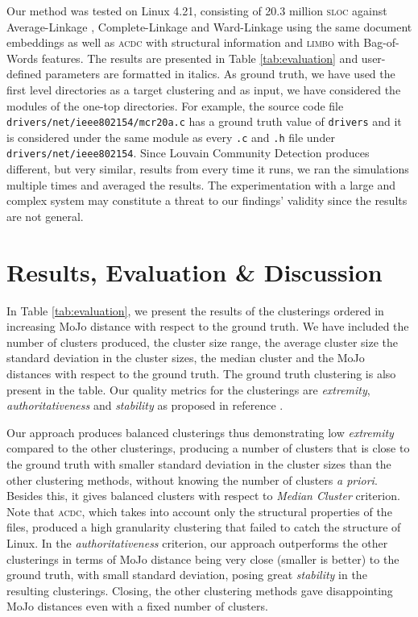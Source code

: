 \documentclass[sigconf, screen]{acmart}
\begin{document}
 Our method was tested on Linux 4.21,
consisting of 20.3 million \textsc{sloc} against Average-Linkage \cite{average}, Complete-Linkage \cite{complete} 
and Ward-Linkage \cite{ward} using the same document embeddings
as well as \textsc{acdc} with structural information \cite{acdc} and \textsc{limbo} \cite{limbo} with Bag-of-Words features. The results are presented in Table \ref{tab:evaluation} and user-defined parameters are formatted in italics. 
As ground truth, we have used the first level directories as a target clustering and as input, we have considered 
the modules of the one-top directories. 
For example, the source code file \texttt{drivers/net/ieee802154\-/mcr20a.c} has a ground truth value of \texttt{drivers} 
and it is considered under the same module as every \texttt{.c} and \texttt{.h} file under \texttt{drivers/net/ieee802154}. Since Louvain Community Detection produces different, but very similar, results from every time it runs, we ran the simulations 
multiple times and averaged the results. 
The experimentation with a large and complex system may constitute a threat to our findings' validity since the results are not general.  


\section{Results, Evaluation \& Discussion}

In Table \ref{tab:evaluation}, we present the results of the clusterings ordered in increasing MoJo distance 
with respect to the ground truth. 
We have included the number of clusters produced, the cluster size range, the average cluster size the standard
deviation in the cluster sizes, the median cluster and the MoJo distances with respect to the ground truth. 
The ground truth clustering is also present in the table. 
Our quality metrics for the clusterings are 
\emph{extremity}, \emph{authoritativeness} and \emph{stability} as proposed in reference \cite{evaluation}.

Our approach produces balanced clusterings thus demonstrating low \emph{extremity} compared to the other clusterings, 
producing a number of clusters that is close to the ground truth with smaller standard deviation in the cluster sizes than 
the other clustering methods, without knowing the number of clusters \emph{a priori}. 
Besides this, it gives balanced clusters with respect to \emph{Median Cluster} criterion. 
Note that \textsc{acdc}, which takes into account only the structural properties of the files, produced a high 
granularity clustering that failed to catch the structure of Linux. 
In the \emph{authoritativeness} criterion, our approach outperforms the other clusterings
in terms of MoJo distance being very close (smaller is better) to the ground truth, with small standard deviation, posing great \emph{stability} in the resulting clusterings. 
Closing, the other clustering methods gave disappointing MoJo distances even with a fixed number of clusters. 
\end{document}
